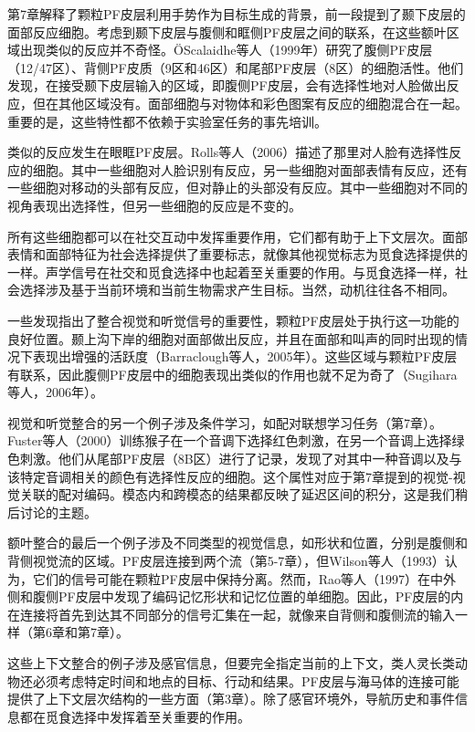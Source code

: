 \par
第7章解释了颗粒PF皮层利用手势作为目标生成的背景，前一段提到了颞下皮层的面部反应细胞。考虑到颞下皮层与腹侧和眶侧PF皮层之间的联系，在这些额叶区域出现类似的反应并不奇怪。ÖScalaidhe等人（1999年）研究了腹侧PF皮层（12/47区）、背侧PF皮质（9区和46区）和尾部PF皮层（8区）的细胞活性。他们发现，在接受颞下皮层输入的区域，即腹侧PF皮层，会有选择性地对人脸做出反应，但在其他区域没有。面部细胞与对物体和彩色图案有反应的细胞混合在一起。重要的是，这些特性都不依赖于实验室任务的事先培训。
\par
类似的反应发生在眼眶PF皮层。Rolls等人（2006）描述了那里对人脸有选择性反应的细胞。其中一些细胞对人脸识别有反应，另一些细胞对面部表情有反应，还有一些细胞对移动的头部有反应，但对静止的头部没有反应。其中一些细胞对不同的视角表现出选择性，但另一些细胞的反应是不变的。
\par
所有这些细胞都可以在社交互动中发挥重要作用，它们都有助于上下文层次。面部表情和面部特征为社会选择提供了重要标志，就像其他视觉标志为觅食选择提供的一样。声学信号在社交和觅食选择中也起着至关重要的作用。与觅食选择一样，社会选择涉及基于当前环境和当前生物需求产生目标。当然，动机往往各不相同。
\par
一些发现指出了整合视觉和听觉信号的重要性，颗粒PF皮层处于执行这一功能的良好位置。颞上沟下岸的细胞对面部做出反应，并且在面部和叫声的同时出现的情况下表现出增强的活跃度（Barraclough等人，2005年）。这些区域与颗粒PF皮层有联系，因此腹侧PF皮层中的细胞表现出类似的作用也就不足为奇了（Sugihara等人，2006年）。
\par
视觉和听觉整合的另一个例子涉及条件学习，如配对联想学习任务（第7章）。Fuster等人（2000）训练猴子在一个音调下选择红色刺激，在另一个音调上选择绿色刺激。他们从尾部PF皮层（8B区）进行了记录，发现了对其中一种音调以及与该特定音调相关的颜色有选择性反应的细胞。这个属性对应于第7章提到的视觉-视觉关联的配对编码。模态内和跨模态的结果都反映了延迟区间的积分，这是我们稍后讨论的主题。
\par
额叶整合的最后一个例子涉及不同类型的视觉信息，如形状和位置，分别是腹侧和背侧视觉流的区域。PF皮层连接到两个流（第5-7章），但Wilson等人（1993）认为，它们的信号可能在颗粒PF皮层中保持分离。然而，Rao等人（1997）在中外侧和腹侧PF皮层中发现了编码记忆形状和记忆位置的单细胞。因此，PF皮层的内在连接将首先到达其不同部分的信号汇集在一起，就像来自背侧和腹侧流的输入一样（第6章和第7章）。
\par
这些上下文整合的例子涉及感官信息，但要完全指定当前的上下文，类人灵长类动物还必须考虑特定时间和地点的目标、行动和结果。PF皮层与海马体的连接可能提供了上下文层次结构的一些方面（第3章）。除了感官环境外，导航历史和事件信息都在觅食选择中发挥着至关重要的作用。
